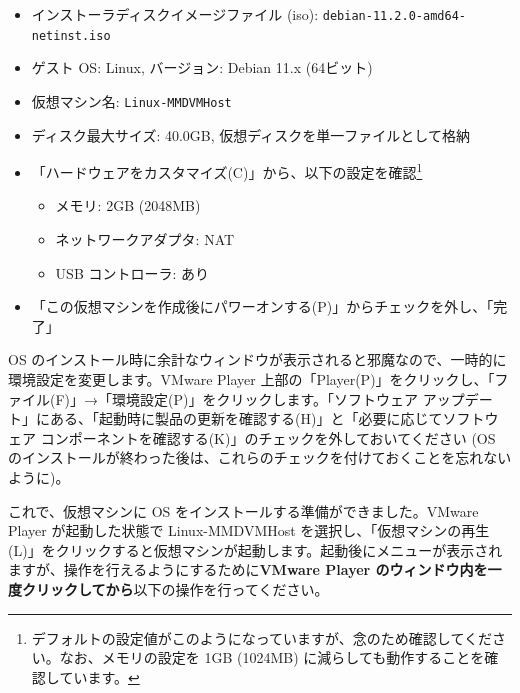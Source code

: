 \documentclass[a4j,oneside]{ujbook}
\begin{document}
\begin{itemize}
 \item インストーラディスクイメージファイル (iso): \verb+debian-11.2.0-amd64-netinst.iso+
 \item ゲスト OS: Linux, バージョン: Debian 11.x (64ビット)
 \item 仮想マシン名: \verb+Linux-MMDVMHost+
 \item ディスク最大サイズ: 40.0GB, 仮想ディスクを単一ファイルとして格納
 \item 「ハードウェアをカスタマイズ(C)」から、以下の設定を確認\footnote{デフォルトの設定値がこのようになっていますが、念のため確認してください。なお、メモリの設定を 1GB (1024MB) に減らしても動作することを確認しています。}
 \begin{itemize}
  \item メモリ: 2GB (2048MB)
  \item ネットワークアダプタ: NAT
  \item USB コントローラ: あり
 \end{itemize}
 \item 「この仮想マシンを作成後にパワーオンする(P)」からチェックを外し、「完了」
\end{itemize}

OS のインストール時に余計なウィンドウが表示されると邪魔なので、一時的に環境設定を変更します。VMware Player 上部の「Player(P)」をクリックし、「ファイル(F)」→「環境設定(P)」をクリックします。「ソフトウェア アップデート」にある、「起動時に製品の更新を確認する(H)」と「必要に応じてソフトウェア コンポーネントを確認する(K)」のチェックを外しておいてください (OS のインストールが終わった後は、これらのチェックを付けておくことを忘れないように)。

これで、仮想マシンに OS をインストールする準備ができました。VMware Player が起動した状態で Linux-MMDVMHost を選択し、「仮想マシンの再生(L)」をクリックすると仮想マシンが起動します。起動後にメニューが表示されますが、操作を行えるようにするために\textbf{VMware Player のウィンドウ内を一度クリックしてから}以下の操作を行ってください。
\end{document}

